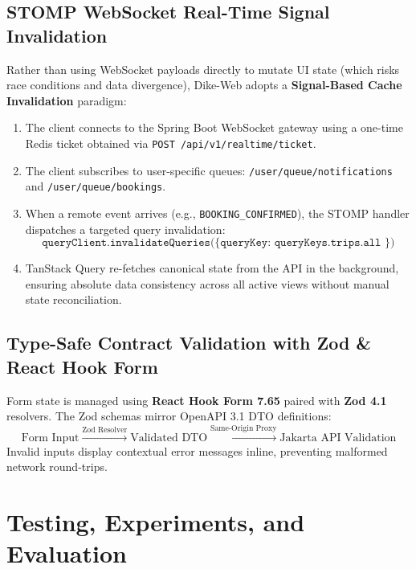 \documentclass[conference,10pt,a4paper]{IEEEtran}
\begin{document}
\subsection{STOMP WebSocket Real-Time Signal Invalidation}
Rather than using WebSocket payloads directly to mutate UI state (which risks race conditions and data divergence), Dike-Web adopts a \textbf{Signal-Based Cache Invalidation} paradigm:
\begin{enumerate}
    \item The client connects to the Spring Boot WebSocket gateway using a one-time Redis ticket obtained via \texttt{POST /api/v1/realtime/ticket}.
    \item The client subscribes to user-specific queues: \texttt{/user/queue/notifications} and \texttt{/user/queue/bookings}.
    \item When a remote event arrives (e.g., \texttt{BOOKING\_CONFIRMED}), the STOMP handler dispatches a targeted query invalidation:
    \begin{equation}
    \texttt{queryClient.invalidateQueries(\{ queryKey: queryKeys.trips.all \})}
    \end{equation}
    \item TanStack Query re-fetches canonical state from the API in the background, ensuring absolute data consistency across all active views without manual state reconciliation.
\end{enumerate}

\subsection{Type-Safe Contract Validation with Zod \& React Hook Form}
Form state is managed using \textbf{React Hook Form 7.65} paired with \textbf{Zod 4.1} resolvers. The Zod schemas mirror OpenAPI 3.1 DTO definitions:
\begin{equation}
\text{Form Input} \xrightarrow{\text{Zod Resolver}} \text{Validated DTO} \xrightarrow{\text{Same-Origin Proxy}} \text{Jakarta API Validation}
\end{equation}
Invalid inputs display contextual error messages inline, preventing malformed network round-trips.

\section{Testing, Experiments, and Evaluation}
\end{document}
